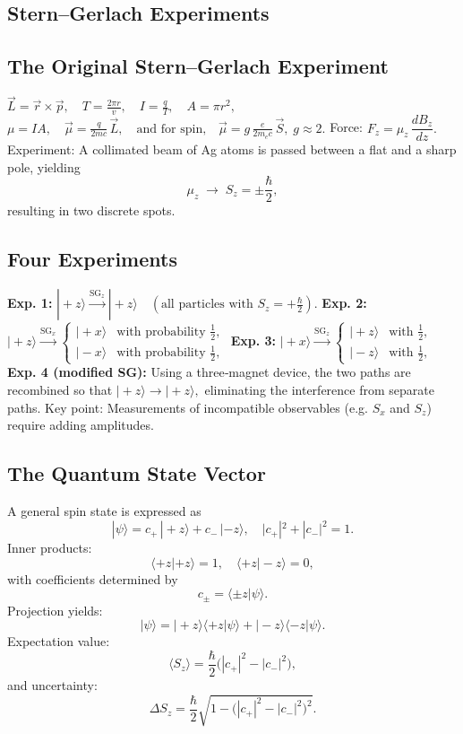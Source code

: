 \documentclass[twocolumn]{article}
\begin{document}
\raggedbottom
\begin{spacing}{1}

  \section{Stern–Gerlach Experiments}

  \subsection{The Original Stern–Gerlach Experiment}
  $\vec{L} = \vec{r}\times\vec{p},\quad T = \frac{2\pi r}{v},\quad I = \frac{q}{T},\quad A = \pi r^2,$  
  $\mu = IA,\quad \vec{\mu} = \frac{q}{2mc}\,\vec{L},\quad \text{and for spin,}\quad \vec{\mu} = g\,\frac{e}{2m_e c}\,\vec{S},\; g\approx2.$  
  Force: $F_z = \mu_z\,\dfrac{dB_z}{dz}.$  
  Experiment: A collimated beam of Ag atoms is passed between a flat and a sharp pole, yielding  
  $$\mu_z\; \to\; S_z = \pm\frac{\hbar}{2},$$  
  resulting in two discrete spots.
  
  \subsection{Four Experiments}
  \textbf{Exp. 1:}  
  $|\!+\!z\rangle \xrightarrow{\text{SG}_z} |\!+\!z\rangle \quad (\text{all particles with } S_z=+\tfrac{\hbar}{2}).$  
  \textbf{Exp. 2:}  
  $|\!+\!z\rangle \xrightarrow{\text{SG}_x} 
  \begin{cases} 
  |\!+\!x\rangle &\text{with probability } \tfrac{1}{2},\\ 
  |\!-\!x\rangle &\text{with probability } \tfrac{1}{2},
  \end{cases}$  
  \textbf{Exp. 3:}  
  $|\!+\!x\rangle \xrightarrow{\text{SG}_z} 
  \begin{cases} 
  |\!+\!z\rangle &\text{with } \tfrac{1}{2},\\ 
  |\!-\!z\rangle &\text{with } \tfrac{1}{2},
  \end{cases}$  
  \textbf{Exp. 4 (modified SG):}  
  Using a three‐magnet device, the two paths are recombined so that  
  $|\!+\!z\rangle \to |\!+\!z\rangle,$  
  eliminating the interference from separate paths.  
  Key point: Measurements of incompatible observables (e.g. $S_x$ and $S_z$) require adding amplitudes.
  
  \subsection{The Quantum State Vector}
  A general spin state is expressed as  
  $$|\psi\rangle = c_{+}\,|+z\rangle + c_{-}\,|-z\rangle,\quad |c_{+}|^2+|c_{-}|^2=1.$$  
  Inner products:  
  $$\langle+z|+z\rangle=1,\quad \langle+z|-z\rangle=0,$$  
  with coefficients determined by  
  $$c_{\pm} = \langle\pm z|\psi\rangle.$$  
  Projection yields:  
  $$|\psi\rangle = |+z\rangle\langle+z|\psi\rangle + |-z\rangle\langle-z|\psi\rangle.$$  
  Expectation value:  
  $$\langle S_z\rangle = \frac{\hbar}{2}\Big(|c_{+}|^2 - |c_{-}|^2\Big),$$  
  and uncertainty:  
  $$\Delta S_z = \frac{\hbar}{2}\sqrt{1-\Big(|c_{+}|^2 - |c_{-}|^2\Big)^2}.$$
  

\end{spacing}
\end{document}
